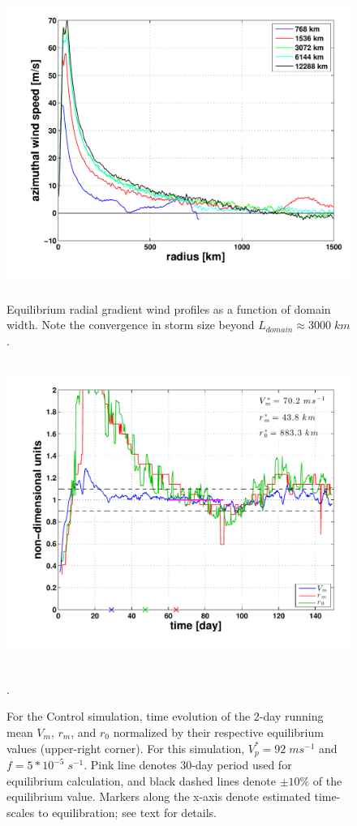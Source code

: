 \documentclass[12pt]{article}
\begin{document}
\begin{figure}[h!]
\centering
  \noindent\includegraphics[width=15cm,height=10cm]{FIGURES_TC_RCE_equilibrium_v2.0/Fig1_Domain_size.pdf}
\caption{Equilibrium radial gradient wind profiles as a function of domain width.  Note the convergence in storm size beyond $L_{domain} \approx 3000 \; km$.}
\label{fig:domainsize}
\end{figure}

\begin{figure}[h!]
\centering
  \noindent\includegraphics[width=15cm,height=10cm]{FIGURES_TC_RCE_equilibrium_v2.0/Fig2_Control_run.pdf}
\caption{For the Control simulation, time evolution of the 2-day running mean $V_m$, $r_m$, and $r_0$ normalized by their respective equilibrium values (upper-right corner). For this simulation, $V^*_p =  92 \; ms^{-1}$ and $f = 5*10^{-5} \; s^{-1}$. Pink line denotes 30-day period used for equilibrium calculation, and black dashed lines denote $\pm10\%$ of the equilibrium value. Markers along the x-axis denote estimated time-scales to equilibration; see text for details.}
\label{fig:timeseries}.
\end{figure}
\end{document}
